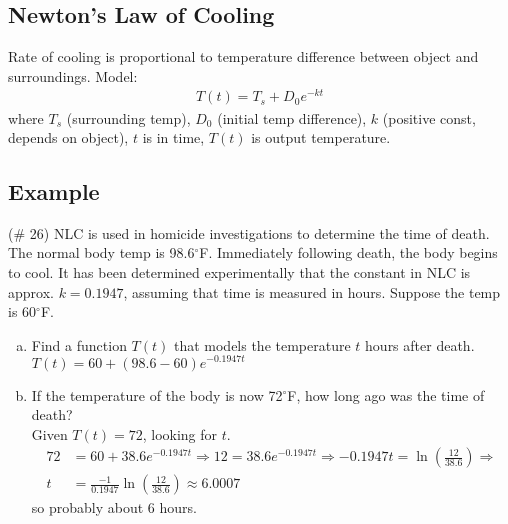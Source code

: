 \documentclass{tufte-handout}
\begin{document}
\subsection{Newton's Law of Cooling}
Rate of cooling is proportional to temperature difference between object and surroundings.
Model:
\begin{align*}
T(t) = T_s + D_0 e^{-kt}
\end{align*}
where $T_s$ (surrounding temp), $D_0$ (initial temp difference), $k$ (positive const, depends on object), $t$ is in time, $T(t)$ is output temperature. 

\subsection{Example}
(\# 26) NLC is used in homicide investigations to determine the time of death.
The normal body temp is 98.6$^\circ$F.
Immediately following death, the body begins to cool.
It has been determined experimentally that the constant in NLC is approx. $k = 0.1947$, assuming that time is measured in hours.
Suppose the temp is 60$^\circ$F. 
\begin{enumerate}[(a)]
\item Find a function $T(t)$ that models the temperature $t$ hours after death. \\
{\color{blue} $T(t) = 60 + (98.6-60)e^{-0.1947t}$}
\item If the temperature of the body is now 72$^\circ$F, how long ago was the time of death? \\
{\color{blue} Given $T(t) = 72$, looking for $t$.
\begin{align*}
72 &= 60 + 38.6 e^{-0.1947t} \Rightarrow 12 = 38.6 e^{-0.1947t} \Rightarrow
-0.1947t = \ln\left( \frac{12}{38.6} \right) \Rightarrow \\
t &= \frac{-1}{0.1947} \ln \left( \frac{12}{38.6} \right)
\approx 6.0007
\end{align*}
so probably about 6 hours.}
\end{enumerate}
\end{document}
